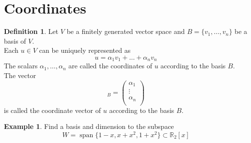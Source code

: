 \documentclass[fleqn, a4paper, 12pt]{article}
\theoremstyle{definition}
\newtheorem{example}{Example}
\newtheorem{definition}{Definition}
\theoremstyle{theorem}
\DeclareMathOperator{\vspan}{\mathrm{span}} %
\begin{document}
\section{Coordinates}

\begin{definition}
	Let $V$ be a finitely generated vector space and $B = \{v_1, \dots, v_n\}$ be a basis of $V$.\\
	Each $u \in V$ can be uniquely represented as
	\begin{equation*}
		u = \alpha_1 v_1 + \dots + \alpha_n v_n
	\end{equation*}
	The scalars $\alpha_1, \dots, \alpha_n$ are called the coordinates of $u$ according to the basis $B$.\\
	The vector 
	\begin{equation*}
		[u]_B = 
		\begin{pmatrix}
			\alpha_1\\
			\vdots\\
			\alpha_n\\
		\end{pmatrix}
	\end{equation*}
	is called the coordinate vector of $u$ according to the basis $B$.
\end{definition}

\begin{example}
	Find a basis and dimension to the subspace
	\begin{equation*}
		W = \vspan \{1 - x, x + x^2, 1 + x^2\} \subset \mathbb{R}_2 [x]
	\end{equation*}
\end{example}
\end{document}
